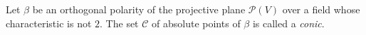 Let $\beta$ be an orthogonal polarity of the projective plane $\mathcal{P}(V)$ over a field whose characteristic is not $2$. The set $\mathcal{C}$ of absolute points of $\beta$ is called a \textit{conic}.
